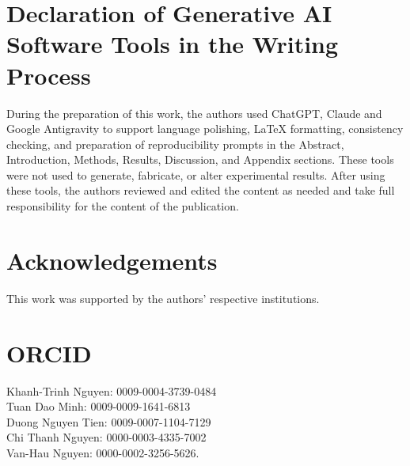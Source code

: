 \documentclass[12pt,a4paper]{jedm}
\begin{document}
\appendix


\section*{Declaration of Generative AI Software Tools in the Writing Process}
During the preparation of this work, the authors used ChatGPT, Claude and Google Antigravity to support language polishing, LaTeX formatting, consistency checking, and preparation of reproducibility prompts in the Abstract, Introduction, Methods, Results, Discussion, and Appendix sections. These tools were not used to generate, fabricate, or alter experimental results. After using these tools, the authors reviewed and edited the content as needed and take full responsibility for the content of the publication.

\section*{Acknowledgements}
This work was supported by the authors' respective institutions.

\section*{ORCID}
\noindent Khanh-Trinh Nguyen: 0009-0004-3739-0484\\
\noindent Tuan Dao Minh: 0009-0009-1641-6813\\
\noindent Duong Nguyen Tien: 0009-0007-1104-7129\\
\noindent Chi Thanh Nguyen: 0000-0003-4335-7002\\
\noindent Van-Hau Nguyen: 0000-0002-3256-5626.



% 
\end{document}
